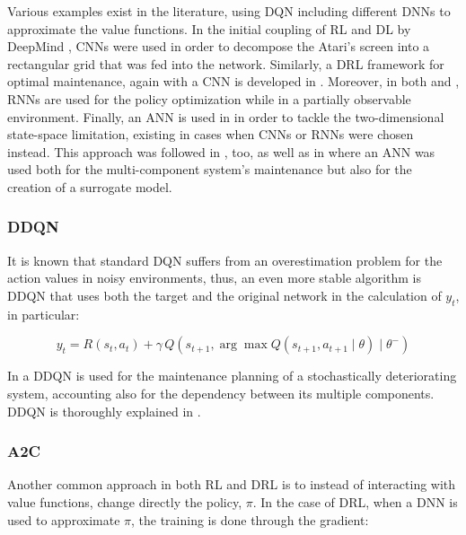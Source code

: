 Various examples exist in the literature, using \gls{DQN} including different \glspl{DNN} to approximate the value functions. In the initial coupling of \gls{RL} and \gls{DL} by DeepMind \cite{mnih2013playing}, \glspl{CNN} were used in order to decompose the Atari's screen into a rectangular grid that was fed into the network. Similarly, a \gls{DRL} framework for optimal maintenance, again with a \gls{CNN} is developed in \cite{wei2020optimal}. Moreover, in both \cite{hausknecht2015deep} and \cite{meng2021memory}, \glspl{RNN} are used for the policy optimization while in a partially observable environment. Finally, an \gls{ANN} is used in \cite{egorov2015deep} in order to tackle the two-dimensional state-space limitation, existing in cases when \glspl{CNN} or \glspl{RNN} were chosen instead. This approach was followed in \cite{rocchetta2019reinforcement}, too, as well as in \cite{yang2022adaptive} where an \gls{ANN} was used both for the multi-component system's maintenance but also for the creation of a surrogate model.



\subsubsection{\acrfull{DDQN}}

It is known that standard \gls{DQN} suffers from an overestimation problem for the action values in noisy environments, thus, an even more stable algorithm is \gls{DDQN} that uses both the target and the original network in the calculation of $y_t$,  in particular:

\begin{equation}
    y_{t}=R(s_{t}, a_{t})+\gamma \,Q\left(s_{t+1}, \arg \max Q\left(s_{t+1}, a_{t+1} \mid \theta \right) \mid \theta^- \right)
\end{equation}

In \cite{zhang2020deep} a \gls{DDQN} is used for the maintenance planning of a stochastically deteriorating system, accounting also for the dependency between its multiple components. \gls{DDQN} is thoroughly explained in \cite{van2016deep}.

\subsubsection{\acrfull{A2C}}

Another common approach in both \gls{RL} and \gls{DRL} is to instead of interacting with value functions, change directly the policy, $\pi$. In the case of \gls{DRL}, when a \gls{DNN} is used to approximate $\pi$, the training is done through the gradient:

